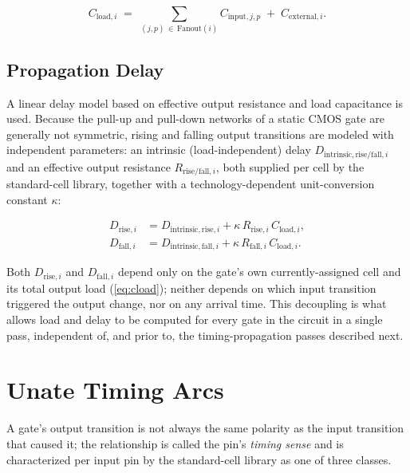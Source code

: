 \begin{equation}
    C_{\mathrm{load},i} \;=\; \sum_{(j,p)\,\in\,\mathrm{Fanout}(i)} C_{\mathrm{input},j,p} \;+\; C_{\mathrm{external},i}.
    \label{eq:cload}
\end{equation}

\subsection{Propagation Delay}

A linear delay model based on effective output resistance and load
capacitance is used. Because the pull-up and pull-down networks of a static
CMOS gate are generally not symmetric, rising and falling output transitions
are modeled with independent parameters: an intrinsic (load-independent)
delay $D_{\mathrm{intrinsic},\mathrm{rise}/\mathrm{fall},i}$ and an
effective output resistance $R_{\mathrm{rise}/\mathrm{fall},i}$, both
supplied per cell by the standard-cell library, together with a
technology-dependent unit-conversion constant $\kappa$:

\begin{align}
    D_{\mathrm{rise},i} &= D_{\mathrm{intrinsic},\mathrm{rise},i} + \kappa\, R_{\mathrm{rise},i}\, C_{\mathrm{load},i}, \label{eq:drise}\\
    D_{\mathrm{fall},i} &= D_{\mathrm{intrinsic},\mathrm{fall},i} + \kappa\, R_{\mathrm{fall},i}\, C_{\mathrm{load},i}. \label{eq:dfall}
\end{align}

Both $D_{\mathrm{rise},i}$ and $D_{\mathrm{fall},i}$ depend only on the
gate's own currently-assigned cell and its total output load
(\cref{eq:cload}); neither depends on which input transition triggered the
output change, nor on any arrival time. This decoupling is what allows load
and delay to be computed for every gate in the circuit in a single pass,
independent of, and prior to, the timing-propagation passes described next.

\section{Unate Timing Arcs}
\label{sec:bg-unate}

A gate's output transition is not always the same polarity as the input
transition that caused it; the relationship is called the pin's
\emph{timing sense} and is characterized per input pin by the standard-cell
library as one of three classes.


